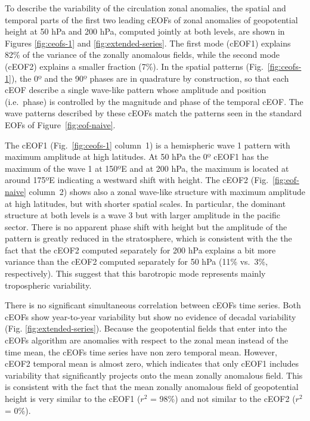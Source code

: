 \documentclass[pdflatex,lineno,sn-basic]{sn-jnl}
\theoremstyle{thmstyleone}%
\theoremstyle{thmstyletwo}%
\theoremstyle{thmstylethree}%
\begin{document}
To describe the variability of the circulation zonal anomalies, the spatial and temporal parts of the first two leading cEOFs of zonal anomalies of geopotential height at 50 hPa and 200 hPa, computed jointly at both levels, are shown in Figures \ref{fig:ceofs-1} and \ref{fig:extended-series}.
The first mode (cEOF1) explains 82\% of the variance of the zonally anomalous fields, while the second mode (cEOF2) explains a smaller fraction (7\%).
In the spatial patterns (Fig.~\ref{fig:ceofs-1}), the 0º and the 90º phases are in quadrature by construction, so that each cEOF describe a single wave-like pattern whose amplitude and position (i.e.~phase) is controlled by the magnitude and phase of the temporal cEOF.
The wave patterns described by these cEOFs match the patterns seen in the standard EOFs of Figure~\ref{fig:eof-naive}.

The cEOF1 (Fig.~\ref{fig:ceofs-1} column~1) is a hemispheric wave 1 pattern with maximum amplitude at high latitudes.
At 50 hPa the 0º cEOF1 has the maximum of the wave 1 at 150ºE and at 200 hPa, the maximum is located at around 175ºE indicating a westward shift with height.
The cEOF2 (Fig.~\ref{fig:eof-naive} column~2) shows also a zonal wave-like structure with maximum amplitude at high latitudes, but with shorter spatial scales.
In particular, the dominant structure at both levels is a wave 3 but with larger amplitude in the pacific sector.
There is no apparent phase shift with height but the amplitude of the pattern is greatly reduced in the stratosphere, which is consistent with the the fact that the cEOF2 computed separately for 200 hPa explains a bit more variance than the cEOF2 computed separately for 50 hPa (11\% vs.~3\%, respectively).
This suggest that this barotropic mode represents mainly tropospheric variability.

There is no significant simultaneous correlation between cEOFs time series.
Both cEOFs show year-to-year variability but show no evidence of decadal variability (Fig. \ref{fig:extended-series}).
Because the geopotential fields that enter into the cEOFs algorithm are anomalies with respect to the zonal mean instead of the time mean, the cEOFs time series have non zero temporal mean.
However, cEOF2 temporal mean is almost zero, which indicates that only cEOF1 includes variability that significantly projects onto the mean zonally anomalous field.
This is consistent with the fact that the mean zonally anomalous field of geopotential height is very similar to the cEOF1 (\(r^2\) = 98\%) and not similar to the cEOF2 (\(r^2\) = 0\%).
\end{document}
